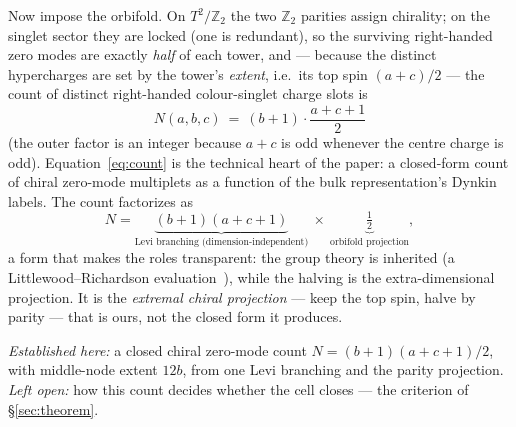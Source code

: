 \documentclass[11pt,a4paper]{article}
\newcommand{\ZZ}{\mathbb{Z}}
\begin{document}
Now impose the orbifold. On $T^2/\mathbb{Z}_2$ the two $\ZZ_2$ parities assign chirality;
on the singlet sector they are locked (one is redundant), so the surviving right-handed
zero modes are exactly \emph{half} of each tower, and --- because the distinct hypercharges
are set by the tower's \emph{extent}, i.e.\ its top spin $(a+c)/2$ --- the count of distinct
right-handed colour-singlet charge slots is
\begin{equation}\label{eq:count}
\boxed{\,N(a,b,c)\ =\ (b+1)\cdot\frac{a+c+1}{2}\,}
\end{equation}
(the outer factor is an integer because $a+c$ is odd whenever the centre charge is odd).
Equation~\eqref{eq:count} is the technical heart of the paper: a closed-form count of
chiral zero-mode multiplets as a function of the bulk representation's Dynkin labels. The
count factorizes as
\[
N=\underbrace{(b+1)(a+c+1)}_{\text{Levi branching (dimension-independent)}}\ \times\ \underbrace{\tfrac12}_{\text{orbifold projection}},
\]
a form that makes the roles transparent: the group theory is inherited (a
Littlewood--Richardson evaluation~\cite{Fulton,GW}), while the halving is the
extra-dimensional projection. It is the \emph{extremal chiral projection} --- keep the top
spin, halve by parity --- that is ours, not the closed form it produces.

\emph{Established here:} a closed chiral zero-mode count $N=(b+1)(a+c+1)/2$, with
middle-node extent $12b$, from one Levi branching and the parity projection. \emph{Left
open:} how this count decides whether the cell closes --- the criterion of
\S\ref{sec:theorem}.
\end{document}
